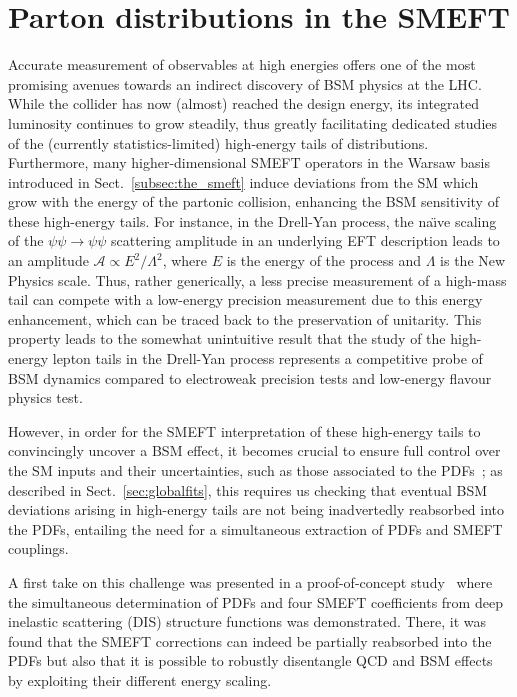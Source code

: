 \documentclass[withindex,glossary]{cam-thesis}
\begin{document}
\section{Parton distributions in the SMEFT}
\label{sec:introduction}
Accurate measurement of observables at high energies offers one of the most promising avenues towards an indirect discovery of BSM physics at the LHC. While the collider has now (almost) reached the design energy, its integrated luminosity continues to grow
steadily, thus greatly facilitating dedicated studies of the
(currently statistics-limited) high-energy tails of distributions. Furthermore, many higher-dimensional SMEFT operators in the Warsaw basis introduced in Sect.~\ref{subsec:the_smeft} induce deviations from the SM which grow
with the energy of the partonic collision, enhancing the BSM sensitivity
of these high-energy tails.
%
For instance, in the Drell-Yan process,  the na\"{\i}ve  scaling of the $\psi \psi \to \psi \psi$ scattering
amplitude in an underlying EFT description leads to an amplitude
$\mathcal{A} \propto E^2 / \Lambda^2$,  where $E$ is the energy of the process and $\Lambda$ is the New Physics scale.
%
Thus, rather generically, a less precise measurement of a high-mass tail can compete with a low-energy precision measurement due to this energy enhancement, which can be traced back to the preservation of unitarity.
%
This property leads to the somewhat unintuitive result that
the study of the high-energy lepton tails in the Drell-Yan process represents a competitive probe
of BSM dynamics compared to electroweak precision tests and low-energy
flavour physics test.

However, in order for the SMEFT interpretation of these high-energy tails
to convincingly uncover a BSM effect, it becomes crucial to ensure
full control over the SM inputs and their
uncertainties, such as those associated to the PDFs~\cite{Gao:2017yyd};
as described in Sect.~\ref{sec:globalfits}, this requires us checking that
eventual BSM deviations arising in high-energy tails are not being
inadvertedly reabsorbed into the PDFs, entailing the need for a simultaneous
extraction of PDFs and SMEFT couplings.

A first take on this challenge was presented in a proof-of-concept study~\cite{Carrazza:2019sec} where
the simultaneous determination of PDFs and four SMEFT coefficients from deep inelastic scattering (DIS)
structure functions was demonstrated.
%
There, it was found that the SMEFT corrections can indeed be partially reabsorbed into the PDFs
but also that it is possible to robustly disentangle
QCD and BSM effects by exploiting their different energy scaling.
\end{document}
